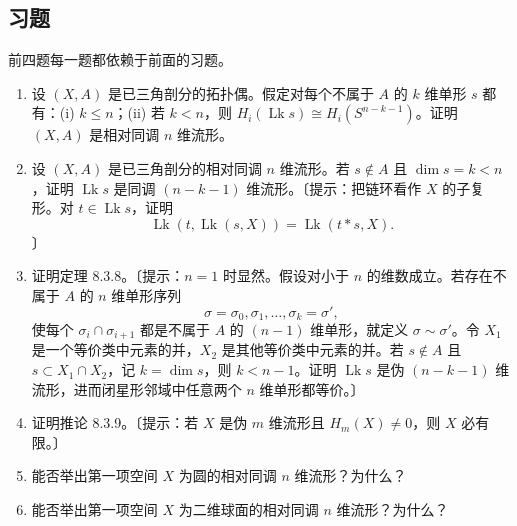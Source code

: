 \subsection*{习题}
前四题每一题都依赖于前面的习题。
\begin{enumerate}
\item 设 $(X,A)$ 是已三角剖分的拓扑偶。假定对每个不属于 $A$ 的 $k$ 维单形 $s$ 都有：(i) $k\le n$；(ii) 若 $k<n$，则 $H_i(\operatorname{Lk}s)\cong H_i(S^{n-k-1})$。证明 $(X,A)$ 是相对同调 $n$ 维流形。
\item 设 $(X,A)$ 是已三角剖分的相对同调 $n$ 维流形。若 $s\notin A$ 且 $\dim s=k<n$，证明 $\operatorname{Lk}s$ 是同调 $(n-k-1)$ 维流形。〔提示：把链环看作 $X$ 的子复形。对 $t\in\operatorname{Lk}s$，证明
\[\operatorname{Lk}(t,\operatorname{Lk}(s,X))=\operatorname{Lk}(t*s,X).\]〕
\item 证明定理 8.3.8。〔提示：$n=1$ 时显然。假设对小于 $n$ 的维数成立。若存在不属于 $A$ 的 $n$ 维单形序列
\[\sigma=\sigma_0,\sigma_1,\ldots,\sigma_k=\sigma',\]
使每个 $\sigma_i\cap\sigma_{i+1}$ 都是不属于 $A$ 的 $(n-1)$ 维单形，就定义 $\sigma\sim\sigma'$。令 $X_1$ 是一个等价类中元素的并，$X_2$ 是其他等价类中元素的并。若 $s\notin A$ 且 $s\subset X_1\cap X_2$，记 $k=\dim s$，则 $k<n-1$。证明 $\operatorname{Lk}s$ 是伪 $(n-k-1)$ 维流形，进而闭星形邻域中任意两个 $n$ 维单形都等价。〕
\item 证明推论 8.3.9。〔提示：若 $X$ 是伪 $m$ 维流形且 $H_m(X)\ne0$，则 $X$ 必有限。〕
\item 能否举出第一项空间 $X$ 为圆的相对同调 $n$ 维流形？为什么？
\item 能否举出第一项空间 $X$ 为二维球面的相对同调 $n$ 维流形？为什么？
\end{enumerate}
